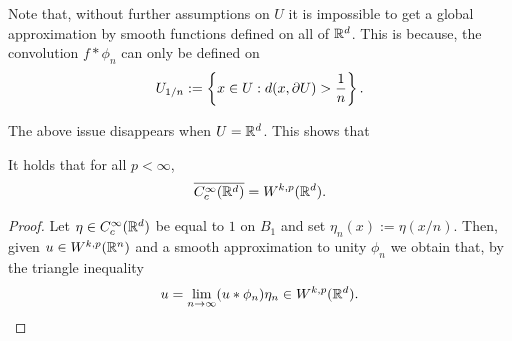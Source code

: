 \documentclass[
    a4paper,
    DIV=14,
    abstract=true,
    numbers=noenddot
]{scrartcl}
\begin{document}
\begin{observation}
	Note that, without further assumptions on $U$ it is impossible to get a global approximation by smooth functions defined on all of $\mathbb{R}^d$. This is because, the convolution $f* \phi_n$ can only be defined on
	\begin{align*}
		U_{1/n}:= \left\{x \in U: d(x,\partial U)> \frac{1}{n}\right\} .
	\end{align*}
\end{observation}
The above issue disappears when $U =\mathbb{R}^d$. This shows that
\begin{theorem}\label{approx rd} It holds that for all $p<\infty$,
	\begin{align*}
		\overline{C_c^\infty(\mathbb{R}^d)}=W^{k,p}(\mathbb{R}^d).
	\end{align*}
\end{theorem}
\begin{proof}
	Let $\eta   \in C_c^\infty(\mathbb{R}^d)$ be equal to  $1$ on  $B_1$ and set $\eta  _n(x):=\eta  (x /n)$.  Then, given $u \in W^{k,p}(\mathbb{R}^n)$ and a smooth approximation to unity $\phi_n$ we obtain that, by the triangle inequality
	\begin{align*}
		u= \lim_{n \to \infty}(u*\phi_n)\eta  _n \in W^{k,p}(\mathbb{R}^d).
	\end{align*}
\end{proof}
\end{document}
